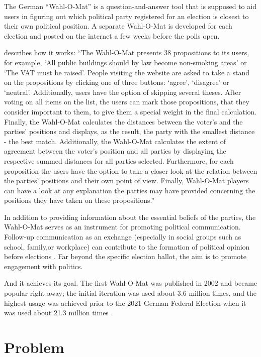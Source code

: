 The German ``Wahl-O-Mat'' \citep{wahlomat} is a question-and-answer tool that is supposed to aid users in figuring out which political party registered for an election is closest to their own political position. A separate Wahl-O-Mat is developed for each election and posted on the internet a few weeks before the polls open.

\citet{wahl-o-mat-marschall} describes how it works: ``The Wahl-O-Mat presents 38 propositions to its users, for example, ‘All public buildings should by law become non-smoking areas’ or ‘The VAT must be raised’. People visiting the website are asked to take a stand on the propositions by clicking one of three buttons: ‘agree’, ‘disagree’ or ‘neutral’. Additionally, users have the option of skipping several theses. After voting on all items on the list, the users can mark those propositions, that they consider important to them, to give them a special weight in the final calculation. Finally, the Wahl-O-Mat calculates the distances between the voter’s and the parties’ positions and displays, as the result, the party with the smallest distance - the best match. Additionally, the Wahl-O-Mat calculates the extent of agreement between the voter’s position and all parties by displaying the respective summed distances for all parties selected. Furthermore, for each proposition the users have the option to take a closer look at the relation between the parties’ positions and their own point of view. Finally, Wahl-O-Mat players can have a look at any explanation the parties may have provided concerning the positions they have taken on these propositions.''

In addition to providing information about the essential beliefs of the parties, the Wahl-O-Mat serves as an instrument for promoting political communication. Follow-up communication as an exchange (especially in social groups such as school, family,or workplace) can contribute to the formation of political opinion before elections \citep{wahl-o-mat-rohmann}. Far beyond the specific election ballot, the aim is to promote engagement with politics.

And it achieves its goal. The first Wahl-O-Mat was published in 2002 and became popular right away; the initial iteration was used about 3.6 million times, and the highest usage was achieved prior to the 2021 German Federal Election when it was used about 21.3 million times \citep{wahl-o-mat-marschall}.

\section{Problem} \label{problem}

